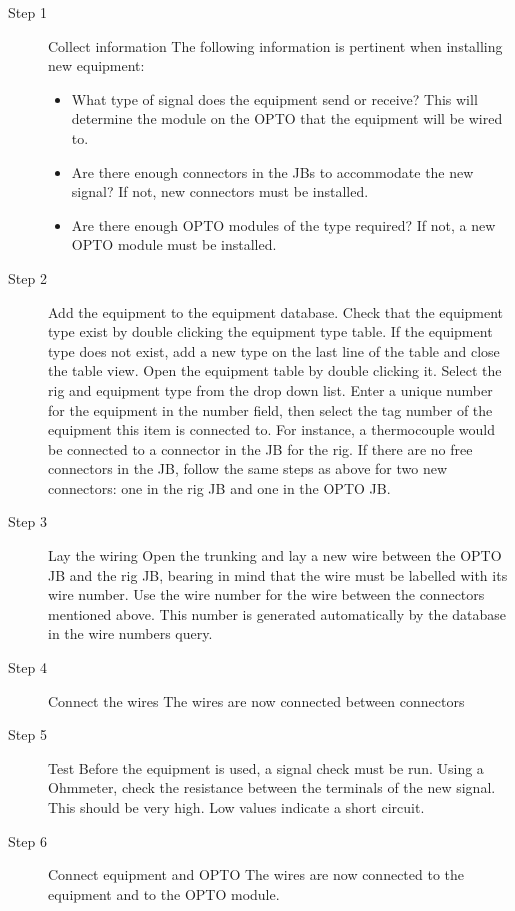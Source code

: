 \begin{description}
\item[Step 1] Collect information
The following information is pertinent when installing new equipment:
\begin{itemize}
	\item	What type of signal does the equipment send or receive?  This will determine the module on the OPTO that the equipment will be wired to.
	\item	Are there enough connectors in the JBs to accommodate the new signal?  If not, new connectors must be installed.
	\item	Are there enough OPTO modules of the type required? If not, a new OPTO module must be installed.
\end{itemize}

\item[Step 2] Add the equipment to the equipment database.
Check that the equipment type exist by double clicking the equipment type table.  If the equipment type does not exist, add a new type on the last line of the table and close the table view.  Open the equipment table by double clicking it.  Select the rig and equipment type from the drop down list.  Enter a unique number for the equipment in the number field, then select the tag number of the equipment this item is connected to.  For instance, a thermocouple would be connected to a connector in the JB for the rig.
If there are no free connectors in the JB, follow the same steps as above for two new connectors: one in the rig JB and one in the OPTO JB.

\item[Step 3] Lay the wiring
Open the trunking and lay a new wire between the OPTO JB and the rig JB, bearing in mind that the wire must be labelled with its wire number.  Use the wire number for the wire between the connectors mentioned above.  This number is generated automatically by the database in the wire numbers query.

\item[Step 4] Connect the wires
The wires are now connected between connectors

\item[Step 5] Test
Before the equipment is used, a signal check must be run.  Using a Ohmmeter, check the resistance between the terminals of the new signal.  This should be very high.  Low values indicate a short circuit.

\item[Step 6] Connect equipment and OPTO
The wires are now connected to the equipment and to the OPTO module.
\end{description}

